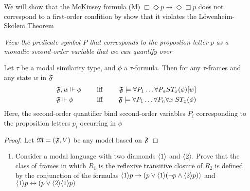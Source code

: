 \documentclass[11pt]{article}
\begin{document}
\begin{examplle}[]
We will show that the McKinsey formula (M) \(\Box\Diamond p\to\Diamond\Box
   p\) does not correspond to a first-order condition by show that it violates
the Löwenheim-Skolem Theorem
\end{examplle}

\begin{center}
\emph{View the predicate symbol \(P\) that corresponds to the propostion letter
\(p\)}
\emph{as a monadic second-order variable that we can quantify over}
\end{center}

\begin{proposition}[]
Let \(\tau\) be a modal similarity type, and \(\phi\) a \(\tau\)-formula. Then for any
\(\tau\)-frames and any state \(w\) in \(\mathfrak{F}\)
\begin{alignat*}{3}
&\mathfrak{F},w\Vdash\phi&\quad\text{ iff }\quad&&\mathfrak{F}\models\forall P_1\dots\forall P_n ST_x(\phi)[w]\\
&\mathfrak{F}\Vdash\phi&\quad\text{ iff }\quad&&\mathfrak{F}\models\forall P_1\dots\forall P_n \forall x\; ST_x(\phi)
\end{alignat*}
Here, the second-order quantifier bind second-order variables \(P_i\)
corresponding to the proposition letters \(p_i\) occurring in \(\phi\)
\end{proposition}

\begin{proof}
Let \(\mathfrak{M}=(\mathfrak{F},V)\) be any model based on \(\mathfrak{F}\)
\end{proof}

\begin{exercise}
\label{ex3.2.1}
\begin{enumerate}
\item Consider a modal language with two diamonds \(\langle1\rangle\) and \(\langle2\rangle\).
Prove that the class of frames in which \(R_1\) is the reflexive
transitive closure of \(R_2\) is defined by the conjunction of the
formulas \(\langle1\rangle p\to(p\vee\langle1\rangle(\neg p\wedge\langle2\rangle p))\)
and \(\langle1\rangle p\leftrightarrow(p\vee\langle2\rangle\langle1\rangle p)\)
\end{enumerate}
\end{exercise}
\end{document}
